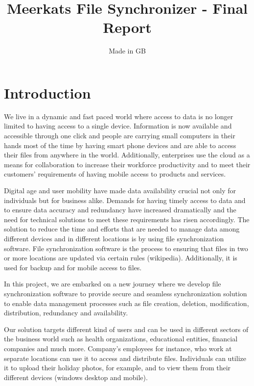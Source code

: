 \documentclass{article}
\title{Meerkats File Synchronizer - Final Report}
\author{Made in GB}
\date{}
\begin{document}
\maketitle{}

\tableofcontents
\newpage


\section{Introduction}
We live in a dynamic and fast paced world where access to data is no longer limited to having access to a single device. Information is now available and accessible through one click and people are carrying small computers in their hands most of the time by having smart phone devices and are able to access their files from anywhere in the world. Additionally, enterprises use the cloud as a means for collaboration to increase their workforce productivity and to meet their customers’ requirements of having mobile access to products and services.

Digital age and user mobility have made data availability crucial not only for individuals but for business alike. Demands for having timely access to data and to ensure data accuracy and redundancy have increased dramatically and the need for technical solutions to meet these requirements has risen accordingly. The solution to reduce the time and efforts that are needed to manage data among different devices and in different locations is by using file synchronization software. File synchronization software is the process to ensuring that files in two or more locations are updated via certain rules (wikipedia). Additionally, it is used for backup and for mobile access to files.

\newline
\hfill \break
In this project, we are embarked on a new journey where we develop file synchronization software to provide secure and seamless synchronization solution to enable data management processes such as file creation, deletion, modification, distribution, redundancy and availability.

Our solution targets different kind of users and can be used in different sectors of the business world such as health organizations, educational entities, financial companies and much more. Company’s employees for instance, who work at separate locations can use it to access and distribute files. Individuals can utilize it to upload their holiday photos, for example, and to view them from their different devices (windows desktop and mobile).
\end{document}
